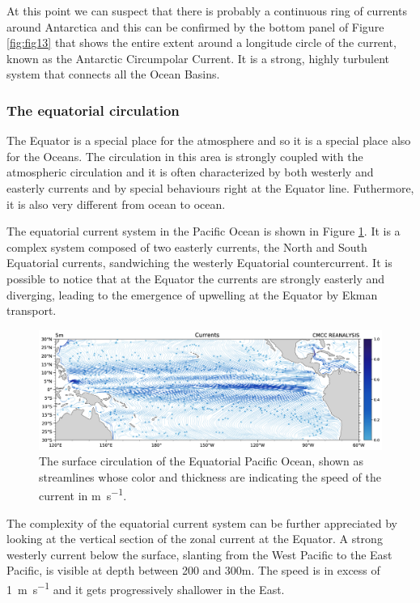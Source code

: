 At this point we can suspect that there is probably a continuous ring of currents around Antarctica and this can be confirmed by the bottom panel of Figure \ref{fig:fig13}  that shows the entire extent around a
longitude circle of the current, known as the Antarctic Circumpolar
Current. It is a strong, highly turbulent system that connects all the
Ocean Basins.

\subsubsection{The equatorial circulation}

The Equator is a special place for the atmosphere and so it is a special
place also for the Oceans. The circulation in this area is strongly
coupled with the atmospheric circulation and it is often characterized
by both westerly and easterly currents and by special behaviours right
at the Equator line. Futhermore, it is also very different from ocean to
ocean.

The equatorial current system in the Pacific Ocean is shown in Figure \ref{fig:surface-circulation-equatorial-pacific-ocean}. It is a complex system composed of two easterly
currents, the North and South Equatorial currents, sandwiching the
westerly Equatorial countercurrent. It is possible to notice that at the
Equator the currents are strongly easterly and diverging, leading to the
emergence of upwelling at the Equator by Ekman transport.

\begin{figure}
	\centering
	\includegraphics[width = 0.6 \textwidth]{figs/surface-circulation-equatorial-pacific-ocean}
	\caption{The surface circulation of the Equatorial Pacific Ocean, shown as streamlines whose color and thickness are indicating the speed of the current in \unit{\meter \per\second}.}
	\label{fig:surface-circulation-equatorial-pacific-ocean}
\end{figure}

The complexity of the equatorial current system can be further
appreciated by looking at the vertical section of the zonal current at
the Equator. A strong westerly current below the
surface, slanting from the West Pacific to the East Pacific, is visible
at depth between 200 and 300m. The speed is in excess of \qty{1}{\meter \per \second} and it
gets progressively shallower in the East.

